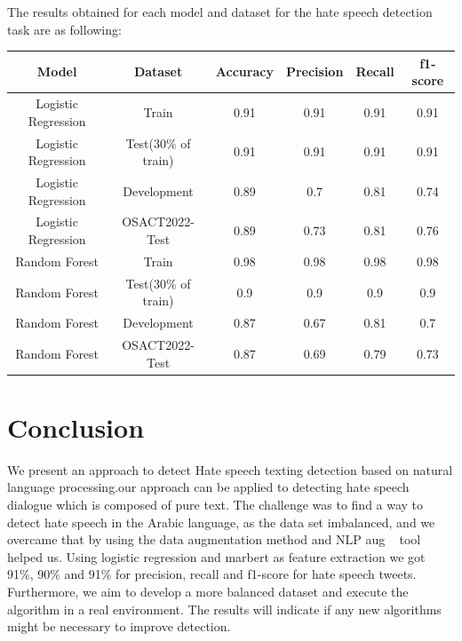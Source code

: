 \documentclass[conference]{IEEEtran}
\begin{document}
The results obtained for each model and dataset for the hate speech detection task are as following:

\begin{table}[htbp]
	\begin{tabular}{|c|c|c|c|c|c|}
		\hline
		Model & Dataset & Accuracy & Precision & Recall & f1-score \\ \hline
		Logistic Regression & Train & 0.91 & 0.91 & 0.91 & 0.91 \\ \hline
		Logistic Regression & Test(30\% of train) & 0.91 & 0.91 & 0.91 & 0.91 \\ \hline
		Logistic Regression & Development & 0.89 & 0.7 & 0.81 & 0.74 \\ \hline
		Logistic Regression & OSACT2022-Test & 0.89 & 0.73 & 0.81 & 0.76 \\ \hline
		Random Forest & Train & 0.98 & 0.98 & 0.98 & 0.98 \\ \hline
		Random Forest & Test(30\% of train) & 0.9 & 0.9 & 0.9 & 0.9 \\ \hline
		Random Forest & Development & 0.87 & 0.67 & 0.81 & 0.7 \\ \hline
		Random Forest & OSACT2022-Test & 0.87 & 0.69 & 0.79 & 0.73 \\ \hline
	\end{tabular}
\end{table}

\section{Conclusion}
We present an approach to detect Hate speech texting detection based on natural language processing.our approach can be applied to detecting hate speech dialogue which is composed of pure text.
The challenge was to find a way to detect hate speech in the Arabic language, as the data set imbalanced, and we overcame that by using the data augmentation method and NLP aug ~\cite{al2020hate} tool helped us.
Using logistic regression and marbert as feature extraction we got 91\%, 90\% and 91\% for precision, recall and f1-score for hate speech tweets.
Furthermore, we aim to develop a more balanced dataset and execute the algorithm in a real environment. The results will indicate if any new algorithms might be necessary to improve
detection.


%
%

\clearpage
\onecolumn



\end{document}
